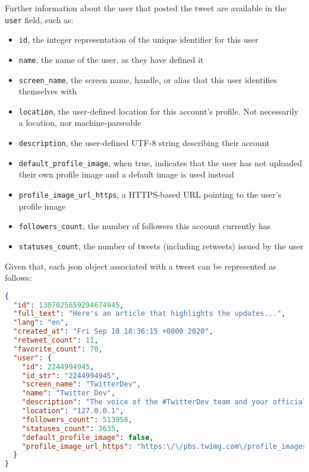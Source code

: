 Further information about the user that posted the tweet are available in the \texttt{user} field, such as:

\begin{itemize}
	\item \texttt{id}, the integer representation of the unique identifier for this user
	\item \texttt{name}, the name of the user, as they have defined it
	\item \texttt{screen\_name}, the screen name, handle, or alias that this user identifies themselves with
	\item \texttt{location}, the user-defined location for this account's profile. Not necessarily a location, nor machine-parseable
	\item \texttt{description}, the user-defined UTF-8 string describing their account
	\item \texttt{default\_profile\_image}, when true, indicates that the user has not uploaded their own profile image and a default image is used instead
	\item \texttt{profile\_image\_url\_https}, a HTTPS-based URL pointing to the user's profile image
	\item \texttt{followers\_count}, the number of followers this account currently has
	\item \texttt{statuses\_count}, the number of tweets (including retweets) issued by the user
\end{itemize}

Given that, each json object associated with a tweet can be represented as follows:

\begin{lstlisting}[language=json, caption={Final json object for a tweet}, captionpos=b, label={lst:tweet_json}]
{
  "id": 1307025659294674945,
  "full_text": "Here's an article that highlights the updates...",
  "lang": "en",
  "created_at": "Fri Sep 18 18:36:15 +0000 2020",
  "retweet_count": 11,
  "favorite_count": 70,
  "user": {
    "id": 2244994945,
    "id_str": "2244994945",
    "screen_name": "TwitterDev",
    "name": "Twitter Dev",
    "description": "The voice of the #TwitterDev team and your official...",
    "location": "127.0.0.1",
    "followers_count": 513958,
    "statuses_count": 3635,
    "default_profile_image": false,
    "profile_image_url_https": "https:\/\/pbs.twimg.com\/profile_images\/1283786620521652229\/lEODkLTh_normal.jpg"
  }
}
\end{lstlisting}




